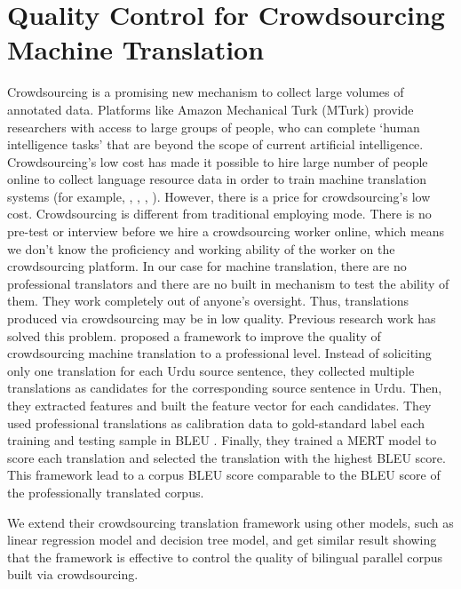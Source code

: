 \section{Quality Control for Crowdsourcing Machine Translation}
Crowdsourcing is a promising new mechanism to collect large volumes of annotated data. Platforms like Amazon Mechanical Turk (MTurk) provide researchers with access to large groups of people, who can complete `human intelligence tasks' that are beyond the scope of current artificial intelligence. Crowdsourcing's low cost has made it possible to hire large number of people online to collect language resource data in order to train machine translation systems (for example,   ,  ,  , ). However, there is a price for crowdsourcing's low cost. Crowdsourcing is different from traditional employing mode. There is no pre-test or interview before we hire a crowdsourcing worker online, which means we don't know the proficiency and working ability of the worker on the crowdsourcing platform. In our case for machine translation, there are no professional translators and there are no built in mechanism to test the ability of them. They work completely out of anyone's oversight. Thus,
translations produced via crowdsourcing may be in low quality. Previous research work has solved this problem.  proposed a framework to improve the quality of crowdsourcing machine translation to a professional level. Instead of soliciting only one translation for each Urdu source sentence, they collected multiple translations as candidates for the corresponding source sentence in Urdu. Then, they extracted features and built the feature vector for each candidates. They used professional translations as calibration data to gold-standard label each training and testing sample in BLEU \cite{papineni2002bleu}. Finally, they trained a MERT \cite{och2003minimum,Zaidan09zmert} model to score each translation and selected the translation with the highest BLEU score. This framework lead to a corpus BLEU score comparable to the BLEU score of the professionally translated corpus.

We extend their crowdsourcing translation framework using other models, such as linear regression model and decision tree model, and get similar result showing that the framework is effective to control the quality of bilingual parallel corpus built via crowdsourcing.
 
